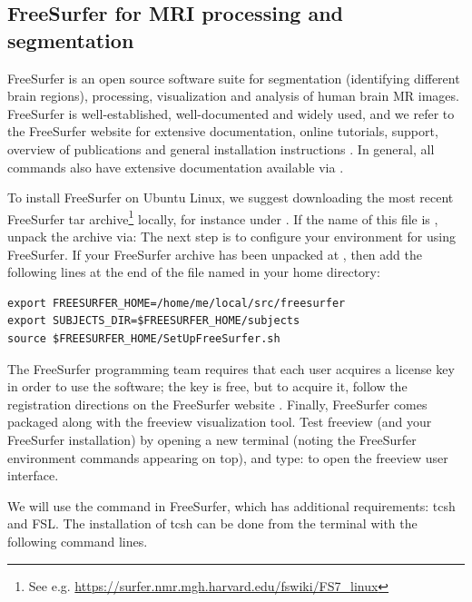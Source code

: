 \subsection{FreeSurfer for MRI processing and segmentation}
\label{sec:chp2:tools:freesurfer}

FreeSurfer \cite{dale1999cortical} is an open source software suite
for segmentation (identifying different brain regions), processing,
visualization and analysis of human brain MR images. FreeSurfer is
well-established, well-documented and widely used, and we refer to the
FreeSurfer website for extensive documentation, online tutorials,
support, overview of publications and general installation
instructions \cite{freesurfer}. In general, all \freesurfer{} commands
also have extensive documentation available via . 

To install FreeSurfer on Ubuntu Linux, we suggest downloading the most
recent FreeSurfer tar archive\footnote{See
  e.g. \url{https://surfer.nmr.mgh.harvard.edu/fswiki/FS7\_linux}}
locally, for instance under . If the name of this
file is , unpack the archive via: 
\noindent The next step is to configure your environment for using
FreeSurfer. If your FreeSurfer archive has been unpacked at
, then add the following lines
at the end of the file named  in your home
directory:
\begin{lstlisting}[style=bashStyle]
export FREESURFER_HOME=/home/me/local/src/freesurfer 
export SUBJECTS_DIR=$FREESURFER_HOME/subjects 
source $FREESURFER_HOME/SetUpFreeSurfer.sh
\end{lstlisting}

\noindent The {FreeSurfer} programming team requires that each user
acquires a license key in order to use the software; the key is free,
but to acquire it, follow the registration directions on the FreeSurfer
website \cite{freesurfer}. Finally, FreeSurfer comes packaged along
with the freeview visualization tool. Test freeview (and your
FreeSurfer installation) by opening a new terminal (noting the
FreeSurfer environment commands appearing on top), and type:
\noindent to open the freeview user interface.

We will use the command  in FreeSurfer, which has
additional requirements: tcsh and FSL. The installation of tcsh can be
done from the terminal with the following command lines.

